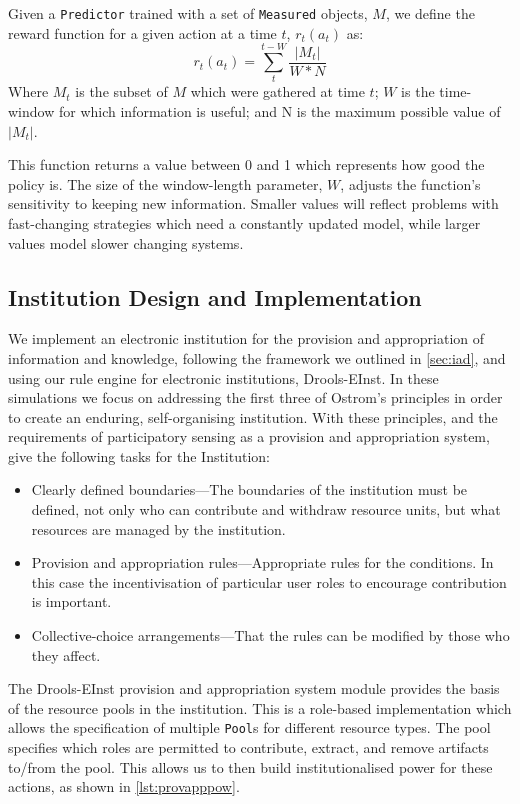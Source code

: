 Given a \texttt{Predictor} trained with a set of \texttt{Measured} objects, $M$, we define the reward function for a given action at a time $t$, $r_t(a_t)$ as:
\begin{equation*}
r_t(a_t) = \sum_t^{t-W} \frac{|M_t|}{W*N}
\end{equation*}
Where $M_t$ is the subset of $M$ which were gathered at time $t$; $W$ is the time-window for which information is useful; and N is the maximum possible value of $|M_t|$.

This function returns a value between 0 and 1 which represents how good the
policy is. The size of the window-length parameter, $W$, adjusts the
function's sensitivity to keeping new information. Smaller values will reflect
problems with fast-changing strategies which need a constantly updated model,
while larger values model slower changing systems.

\subsection{Institution Design and Implementation}

We implement an electronic institution for the provision and appropriation of
information and knowledge, following the framework we outlined in
\autoref{sec:iad}, and using our rule engine for electronic institutions,
Drools-EInst. In these simulations we focus on addressing the first three of
Ostrom's principles in order to create an enduring, self-organising
institution. With these principles, and the requirements of participatory sensing as a provision and appropriation system, give the following tasks for the Institution:

\begin{itemize}
\item Clearly defined boundaries---The boundaries of the institution must be defined, not only who can contribute and withdraw resource units, but what resources are managed by the institution.
\item Provision and appropriation rules---Appropriate rules for the conditions. In this case the incentivisation of particular user roles to encourage contribution is important.
\item Collective-choice arrangements---That the rules can be modified by those who they affect.
\end{itemize}

The Drools-EInst provision and appropriation system module provides the basis
of the resource pools in the institution. This is a role-based implementation
which allows the specification of multiple \texttt{Pool}s for different
resource types. The pool specifies which roles are permitted to contribute,
extract, and remove artifacts to/from the pool. This allows us to then build
institutionalised power for these actions, as shown in \autoref{lst:provapppow}.

